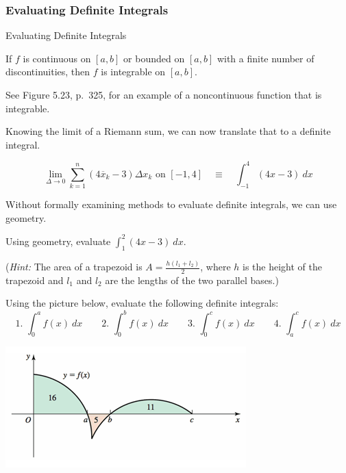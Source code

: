 \documentclass[cal1spr16Lectures.tex]{subfiles}
\begin{document}
\subsubsection{Evaluating Definite Integrals}

\begin{frame}{\small Evaluating Definite Integrals}\footnotesize
\begin{thm}
If $f$ is continuous on $[a,b]$ or bounded on $[a,b]$ with a finite number of discontinuities, then $f$ is integrable on $[a,b]$.
\end{thm}
See Figure 5.23, p.\ 325, for an example of a noncontinuous function that is integrable.

\vspace{0.5pc}
Knowing the limit of a Riemann sum, we can now translate that to a definite integral.
\begin{ex}
\[\displaystyle\lim_{\Delta  \to 0} \sum_{k=1}^n (4\overline{x}_k - 3)\Delta x_k\text{ on }[-1,4] \quad\equiv\quad \int_{-1}^4 (4x-3)\ dx\]
\end{ex}
\end{frame}

\begin{frame}\small
Without formally examining methods to evaluate definite integrals, we can use geometry.
\begin{exe} 
Using geometry, evaluate $\int_1^2 (4x-3)\ dx$. 

\vspace{0.5pc}
(\emph{Hint:}  The area of a trapezoid is $A=\frac{h(l_1+l_2)}{2}$, where $h$ is the height of the trapezoid and $l_1$ and $l_2$ are the lengths of the two parallel bases.)
\end{exe}
\end{frame}

\begin{frame}\footnotesize
\begin{exe} 
Using the picture below, evaluate the following definite integrals:
\[\text{1.\ } \int_0^a f(x)\ dx \qquad \text{2.\ } \int_0^b f(x)\ dx \qquad \text{3.\ } \int_0^c f(x)\ dx \qquad \text{4.\ } \int_a^c f(x)\ dx\]
\vspace{-2pc}

\begin{center}
\includegraphics[scale=0.8]{pictures/Ch5Sect2_Exer31}
\end{center}
\end{exe}
\end{frame}
\end{document}
